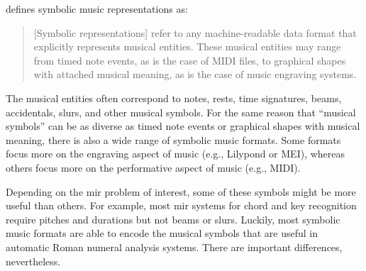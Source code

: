 

\textcite{muller2015music} defines symbolic music
representations as:

\begin{quote}
[Symbolic representations] refer to any machine-readable
data format that explicitly represents musical entities.
These musical entities may range from timed note events, as
is the case of MIDI ﬁles, to graphical shapes with attached
musical meaning, as is the case of music engraving systems.
\end{quote}


The musical entities often correspond to notes, rests, time
signatures, beams, accidentals, slurs, and other musical
symbols. For the same reason that ``musical symbols'' can be
as diverse as timed note events or graphical shapes with
musical meaning, there is also a wide range of symbolic
music formats. Some formats focus more on the engraving
aspect of music (e.g., Lilypond or MEI), whereas others
focus more on the performative aspect of music (e.g., MIDI).

Depending on the \gls{mir} problem of interest, some of these
symbols might be more useful than others. For example, most
\gls{mir} systems for chord and key recognition require pitches
and durations but not beams or slurs. Luckily, most symbolic
music formats are able to encode the musical symbols that
are useful in automatic Roman numeral analysis systems.
There are important differences, nevertheless.
